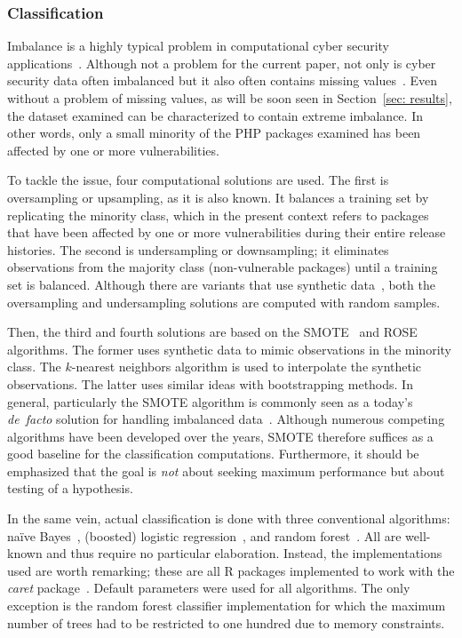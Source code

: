 \documentclass[5p, twocolumn, numbers, sort]{elsarticle}
\begin{document}
\subsubsection{Classification}

Imbalance is a highly typical problem in computational cyber security
applications~\cite{Singh22, Wheelus18}. Although not a problem for the current
paper, not only is cyber security data often imbalanced but it also often
contains missing values~\cite{Tahir25}. Even without a problem of missing
values, as will be soon seen in Section~\ref{sec: results}, the dataset examined
can be characterized to contain extreme imbalance. In other words, only a small
minority of the PHP packages examined has been affected by one or more
vulnerabilities.

To tackle the issue, four computational solutions are used. The first is
oversampling or upsampling, as it is also known. It balances a training set by
replicating the minority class, which in the present context refers to packages
that have been affected by one or more vulnerabilities during their entire
release histories. The second is undersampling or downsampling; it eliminates
observations from the majority class (non-vulnerable packages) until a training
set is balanced. Although there are variants that use synthetic
data~\cite{Singh22}, both the oversampling and undersampling solutions are
computed with random samples.

Then, the third and fourth solutions are based on the SMOTE~\cite{Chawla02,
  Torgo13} and ROSE~\cite{Lunardon14, Menardi14} algorithms. The former uses
synthetic data to mimic observations in the minority class. The $k$-nearest
neighbors algorithm is used to interpolate the synthetic observations. The
latter uses similar ideas with bootstrapping methods. In general, particularly
the SMOTE algorithm is commonly seen as a today's \textit{de~facto} solution
for handling imbalanced data~\cite{Fernandez18}. Although numerous competing
algorithms have been developed over the years, SMOTE therefore suffices as a
good baseline for the classification computations. Furthermore, it should be
emphasized that the goal is \textit{not} about seeking maximum performance but
about testing of a hypothesis.

In the same vein, actual classification is done with three conventional
algorithms: na\"ive Bayes~\cite{Majka24}, (boosted) logistic
regression~\cite{Tuszynski24}, and random forest~\cite{Liaw02}. All are
well-known and thus require no particular elaboration. Instead, the
implementations used are worth remarking; these are all R packages implemented
to work with the \textit{caret} package~\cite{Kuhn08}. Default parameters were
used for all algorithms. The only exception is the random forest classifier
implementation for which the maximum number of trees had to be restricted to one
hundred due to memory constraints.
\end{document}
